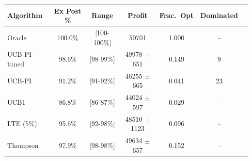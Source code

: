 \begin{tabular}{lcccccc}
\toprule
Algorithm & Ex Post \% & Range & Profit & Frac.\ Opt & Dominated \\
\midrule
Oracle & 100.0\% & [100-100\%] & 50701 & 1.000 & -- \\
UCB-PI-tuned & 98.6\% & [98-99\%] & 49978 $\pm$ 651 & 0.149 & 9 \\
UCB-PI & 91.2\% & [91-92\%] & 46255 $\pm$ 665 & 0.041 & 23 \\
UCB1 & 86.8\% & [86-87\%] & 44024 $\pm$ 597 & 0.029 & -- \\
LTE (5\%) & 95.6\% & [92-98\%] & 48510 $\pm$ 1123 & 0.096 & -- \\
Thompson & 97.9\% & [98-98\%] & 49634 $\pm$ 657 & 0.152 & -- \\
\bottomrule
\end{tabular}
